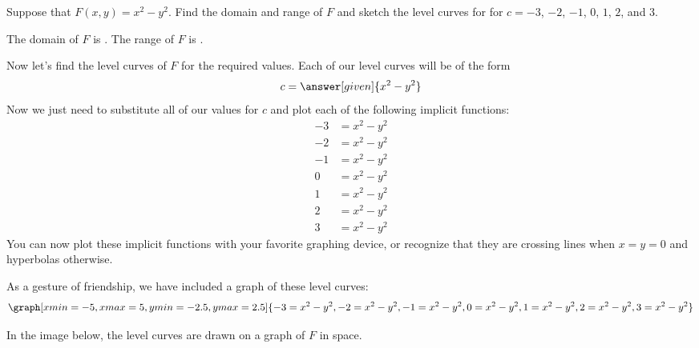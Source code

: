 \documentclass{ximera}
\begin{document}
\begin{example}
  Suppose that $F(x,y) = x^2-y^2$. Find
  the domain and range of $F$ and sketch the level curves for for
  $c=-3$, $-2$, $-1$, $0$, $1$, $2$, and $3$.
  \begin{explanation}
    The domain of $F$ is
    . 
    The range of $F$ is
    \wordChoice{
      \choice{$\R$}
      \choice[correct]{$\R^2$}
      \choice{$[0,\infty)$}
      \choice{$[0,1]$}
      }.

      Now let's find the level curves of $F$ for the required values.
      Each of our level curves will be of the form
      \[
      c = \answer[given]{x^2-y^2}
      \]
      Now we just need to substitute all of our values for $c$ and
      plot each of the following implicit functions:
    \begin{align*}
      -3 &= x^2-y^2\\
      -2 &= x^2-y^2\\
      -1 &= x^2-y^2\\
       0 &= x^2-y^2\\
       1 &= x^2-y^2\\
       2 &= x^2-y^2\\
       3 &= x^2-y^2
    \end{align*}
    You can now plot these implicit functions with your favorite
    graphing device, or recognize that they are crossing lines when
    $x=y=0$ and hyperbolas otherwise.
    \begin{onlineOnly}
      As a gesture of friendship, we have included a graph of these
      level curves:
      \[
      \graph[xmin=-5, xmax=5, ymin=-2.5, ymax=2.5]{-3=x^2-y^2,-2=x^2-y^2,-1=x^2-y^2,0=x^2-y^2,1=x^2-y^2,2=x^2-y^2,3=x^2-y^2}
      \]
    \end{onlineOnly}
    In the image below, the level curves are drawn on a graph of $F$
    in space.
    \begin{image}
\end{image}
\end{explanation}
\end{example}
\end{document}

